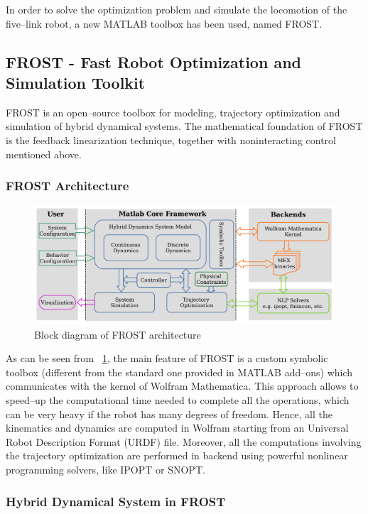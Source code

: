 \documentclass[11pt]{article}
\begin{document}
In order to solve the optimization problem and simulate the locomotion of the five--link robot, a new MATLAB toolbox has been used, named FROST.

\subsection{FROST - Fast Robot Optimization and Simulation Toolkit}

FROST is an open--source toolbox for modeling, trajectory optimization and simulation of hybrid dynamical systems. The mathematical foundation of FROST is the feedback linearization technique, together with noninteracting control mentioned above.

\subsubsection{FROST Architecture}

\begin{figure}[H]
\centering
\includegraphics[width=.8\textwidth]{Images/FROSTFramework.PNG}
\caption{Block diagram of FROST architecture}
\label{blockdiagramfrostarch}
\end{figure}

As can be seen from \figurename~\ref{blockdiagramfrostarch}, the main feature of FROST is a custom symbolic toolbox (different from the standard one provided in MATLAB add--ons) which communicates with the kernel of Wolfram Mathematica. This approach allows to speed--up the computational time needed to complete all the operations, which can be very heavy if the robot has many degrees of freedom. Hence, all the kinematics and dynamics are computed in Wolfram starting from an Universal Robot Description Format (URDF)  file. Moreover, all the computations involving the trajectory optimization are performed in backend using powerful nonlinear programming solvers, like IPOPT or SNOPT.

\subsubsection{Hybrid Dynamical System in FROST}
\end{document}
